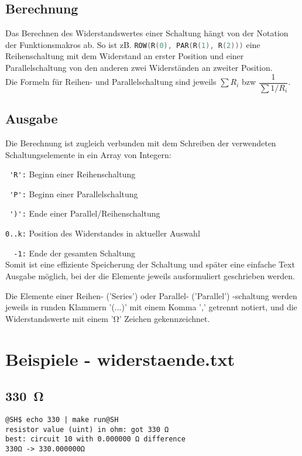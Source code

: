 \documentclass[a4paper,10pt,ngerman]{scrartcl}
\newcommand{\myohm}[1]{\SI{#1}{\ohm}}
\begin{document}
\subsection{Berechnung}
Das Berechnen des Widerstandswertes einer Schaltung hängt von der Notation der Funktionsmakros ab. So ist zB. \lstinline[language=C++]{ROW(R(0), PAR(R(1), R(2)))} eine Reihenschaltung mit dem Widerstand an erster Position und einer Parallelschaltung von den anderen zwei Widerständen an zweiter Position. \\
Die Formeln für Reihen- und Parallelschaltung sind jeweils $\sum\nolimits R_i$  bzw  $\dfrac{1}{\sum\nolimits 1/R_i}$.

\subsection{Ausgabe}
Die Berechnung ist zugleich verbunden mit dem Schreiben der verwendeten Schaltungselemente in ein Array von Integern:

\lstinline{ 'R':} Beginn einer Reihenschaltung

\lstinline{ 'P':} Beginn einer Parallelschaltung

\lstinline{ ')':} Ende einer Parallel/Reihenschaltung

\lstinline{0..k:} Position des Widerstandes in aktueller Auswahl

\lstinline{  -1:} Ende der gesamten Schaltung \\
Somit ist eine effiziente Speicherung der Schaltung und später eine einfache Text Ausgabe möglich, bei der die Elemente jeweils ausformuliert geschrieben werden.

Die Elemente einer Reihen- ('Series') oder Parallel- ('Parallel') -schaltung werden jeweils in runden Klammern '(...)' mit einem Komma ',' getrennt notiert, und die Widerstandswerte mit einem '\si{\ohm}' Zeichen gekennzeichnet.


\pagebreak
\section[Beispiele]{Beispiele - widerstaende.txt}

\subsection{\myohm{330}}
\begin{lstlisting}
@SH$ echo 330 | make run@SH
resistor value (uint) in ohm: got 330 Ω
best: circuit 10 with 0.000000 Ω difference
330Ω -> 330.000000Ω
\end{lstlisting}
\end{document}
